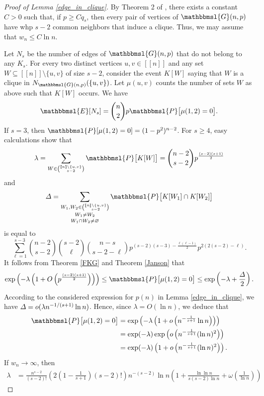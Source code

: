 \documentclass[hidelinks, 11pt]{article}
\theoremstyle{plain}
\theoremstyle{definition}
\begin{document}
\begin{proof}[Proof of Lemma \ref{edge_in_clique}]
By Theorem 2 of  \cite{SP90},  there exists a constant $C>0$ such that, if    $p\geq Cq_s$,   then   every pair of vertices of  $\mathbbmsl{G}(n,p)$     have   whp  $s-2$ common neighbors that induce a clique. Thus, we may assume that $w_n\leq C\ln n$.


Let $N_s$ be the number of edges of  $\mathbbmsl{G}(n,p)$   that do not belong to any $K_s$.
For every two distinct vertices $u,v\in[\![n]\!]$ and any  set   $W\subseteq[\![n]\!]\setminus\{u,v\}$ of size $s-2$, consider the  event $K[W]$ saying that $W$ is a clique in $N_{\mathbbmsl{G}(n,p)}(\{u, v\})$.  Let $\mu(u, v)$ counts the number of sets $W$ as above such that $K[W]$ occurs. We have
\begin{equation}\label{expectation-mu}
\mathbbmsl{E}[N_s]={n\choose 2}p\mathbbmsl{P}\big[\mu(1,2)=0\big].
\end{equation}
If $s=3$, then $\mathbbmsl{P}[\mu(1,2)=0]=(1-p^2)^{n-2}$. For $s\geq 4$, easy  calculations   show that
$$\lambda=\sum_{W\in{[\![n]\!]\setminus\{u, v\}\choose s-2}}\mathbbmsl{P}\big[K[W]\big]={n-2\choose s-2}p^{\frac{(s-2)(s+1)}{2}}$$  and
$$\mathnormal{\Delta}=\mathop{\mathop{\sum_{W_1, W_2\in{[\![n]\!]\setminus\{u,v\}\choose s-2}}}_{W_1\neq W_2}}_{W_1\cap W_2\neq\varnothing}\mathbbmsl{P}\big[K[W_1]\cap K[W_2]\big]$$ is equal to
$$\sum_ {\ell=1}^{s-3}{n-2\choose s-2}{s-2\choose\ell}{n-s\choose s-2-\ell}p^{(s-2)(s-3)-\frac{\ell(\ell-1)}{2}}p^{2(2(s-2)-\ell)}.$$
It follows from  Theorem \ref{FKG} and Theorem \ref{Janson} that
$$\exp\left(-\lambda\left(1+O\left(p^{\frac{(s-2)(s+1)}{2}}\right)\right)\right)\leq\mathbbmsl{P}\big[\mu(1,2)=0\big]\leq
\exp\left(-\lambda+\frac{\mathnormal{\Delta}}{2}\right).$$
According to  the considered expression for  $p(n)$ in  Lemma \ref{edge_in_clique}, we have $\mathnormal{\Delta}=o(\lambda n^{-1/(s+1)}\ln n)$. Hence, since $\lambda=O(\ln n)$,  we deduce  that
\begin{align}
\mathbbmsl{P}\big[\mu(1,2)=0\big]&=\exp\left(-\lambda\left(1+o\left(n^{-\frac{1}{s+1}}\ln n\right)\right)\right)\nonumber\\&=\exp(-\lambda)\exp\left(o\left(n^{-\frac{1}{s+1}}(\ln n)^2\right)\right)\nonumber\\ &=\exp(-\lambda)\left(1+o\left(n^{-\frac{1}{s+1}}(\ln n)^2\right)\right).\label{mu}
\end{align}
If $w_n\to\infty$, then
\begin{align*}
\lambda&=\frac{n^{s-2}}{(s-2)!}\left(2\left(1-\frac{1}{s+1}\right)(s-2)!\right)n^{-(s-2)}\ln n\left(1+\frac{\ln\ln n}{s(s-2)\ln n}+\omega\left(\frac{1}{\ln n}\right)\right)

\end{align*}
\end{proof}
\end{document}
